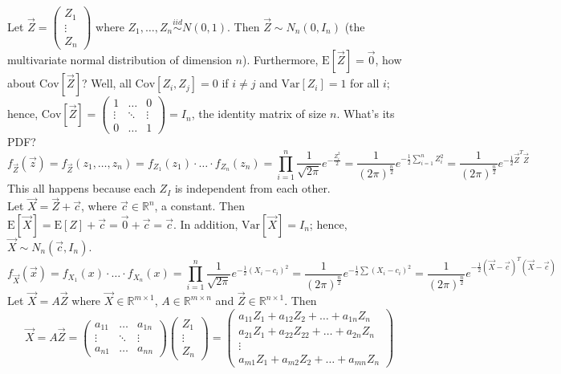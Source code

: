 \documentclass[12pt]{article}
\newcommand{\iid}{\stackrel{iid}{\sim}}
\newcommand{\expected}[1]{\mathrm{E}[#1]}
\newcommand{\variance}[1]{\mathrm{Var}[#1]}
\newcommand{\covariance}[1]{\mathrm{Cov}[#1]}
\begin{document}
Let $\vec{Z} = \begin{pmatrix} Z_1 \\ \vdots \\ Z_n \end{pmatrix} $ where $Z_1, \dots, Z_n \iid N(0,1)$. Then $\vec{Z} \sim N_n(0, I_n)$ (the multivariate normal distribution of dimension $n$). Furthermore, $\expected{\vec{Z}} = \vec{0}$, how about $\covariance{\vec{Z}}$? Well, all $\covariance{Z_i,Z_j} = 0$ if $i \neq j$ and $\variance{Z_i} = 1$ for all $i$; hence, $\covariance{\vec{Z}} = \begin{pmatrix} 1 & \dots & 0 \\ \vdots & \ddots & \vdots \\ 0 & \dots & 1 \end{pmatrix} = I_n $, the identity matrix of size $n$. What's its PDF? 
$$f_{\vec{Z}}(\vec{z}) = f_{\vec{Z}}(z_1,\dots,z_n) = f_{Z_1}(z_1) \cdot \dots \cdot f_{Z_n}(z_n) = \prod_{i=1}^n \frac{1}{\sqrt{2\pi}} e^{-\frac{Z_i^2}{2}} = \frac{1}{(2\pi)^{\frac{n}{2}}}e^{-\frac{1}{2}\sum_{i=1}^n Z_i^2} = \frac{1}{(2\pi)^{\frac{n}{2}}}e^{-\frac{1}{2}\vec{Z}^T\vec{Z}}$$ 
This all happens because each $Z_I$ is independent from each other. \\
Let $\vec{X} = \vec{Z} + \vec{c}$, where $\vec{c} \in \mathbb{R}^n$, a constant. Then $\expected{\vec{X}} = \expected{Z} + \vec{c} = \vec{0} + \vec{c} = \vec{c}$. In addition, $\variance{\vec{X}} = I_n$; hence, $\vec{X} \sim N_n(\vec{c}, I_n)$. 
$$ f_{\vec{X}}(\vec{x}) = f_{X_1}(x)\cdot \dots \cdot f_{X_n}(x) = \prod_{i=1}^n \frac{1}{\sqrt{2\pi}} e^{-\frac{1}{2}(X_i - c_i)^2} = \frac{1}{(2\pi)^{\frac{n}{2}}} e^{-\frac{1}{2}\sum (X_i - c_i)^2} = \frac{1}{(2\pi)^{\frac{n}{2}}} e^{-\frac{1}{2}(\vec{X} - \vec{c})^T(\vec{X} - \vec{c})}$$ 
Let $\vec{X} = A\vec{Z}$ where $\vec{X} \in \mathbb{R}^{m \times 1}$, $A \in \mathbb{R}^{m \times n}$ and $\vec{Z} \in \mathbb{R}^{n \times 1}$. Then 
$$ \vec{X} = A\vec{Z} = \begin{pmatrix} a_{11} & \dots & a_{1n} \\ \vdots & \ddots & \vdots \\ a_{n1} & \dots & a_{nn} \end{pmatrix} \begin{pmatrix} Z_1 \\ \vdots \\ Z_n \end{pmatrix} = \begin{pmatrix} a_{11}Z_1 + a_{12}Z_2 + \dots + a_{1n}Z_n \\ a_{21}Z_1 + a_{22}Z_22 + \dots + a_{2n}Z_n \\ \vdots \\ a_{m1}Z_1 + a_{m2}Z_2 + \dots + a_{mn}Z_n \end{pmatrix}$$ 
\end{document}
